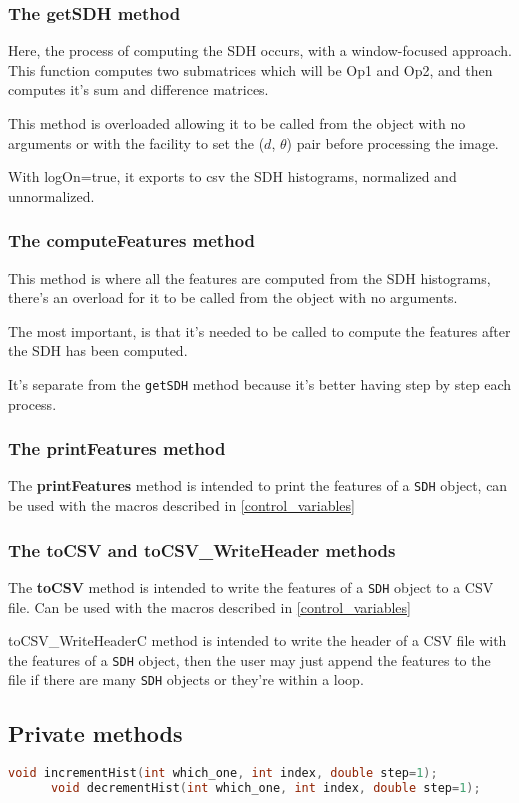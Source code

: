 \subsubsection{The getSDH method}
Here, the process of computing the SDH occurs, with a window-focused approach.
This function computes two submatrices which will be Op1 and Op2,
and then computes it's sum and difference matrices.

This method is overloaded allowing it to be called from the object with no
arguments or with the facility to set the ($d$, $\theta$) pair before
processing the image.

With logOn=true, it exports to csv the SDH histograms, normalized and
unnormalized.

\subsubsection{The computeFeatures method}
This method is where all the features are computed from the SDH histograms,
there's an overload for it to be called from the object with no arguments.

The most important, is that it's needed to be called to compute the features
after the SDH has been computed.

It's separate from the \texttt{getSDH} method because it's better having
step by step each process.

\subsubsection{The printFeatures method}
The \textbf{printFeatures} method is intended to print the features
of a \texttt{SDH} object, can be used with the macros described in 
\ref{control_variables}

\subsubsection{The toCSV and toCSV\_WriteHeader methods}
The \textbf{toCSV} method is intended to write the features of a
\texttt{SDH} object to a CSV file. Can be used with the macros described in
\ref{control_variables}

toCSV\_WriteHeaderC method is intended to write the header of a CSV
file with the features of a \texttt{SDH} object, then the user may just
append the features to the file if there are many \texttt{SDH} objects
or they're within a loop.

\subsection{Private methods}
\begin{file}
  \begin{lstlisting}[language=C]
      void incrementHist(int which_one, int index, double step=1);
      void decrementHist(int which_one, int index, double step=1);
  \end{lstlisting}
\end{file}

